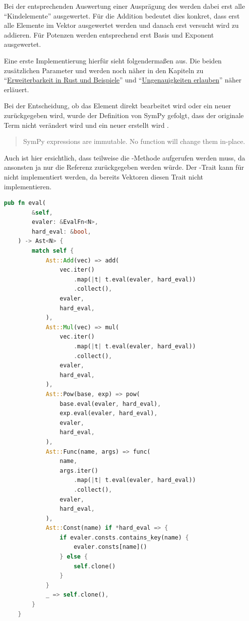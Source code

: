 \documentclass[11pt,a4paper, ngerman]{article}
\begin{document}
Bei der entsprechenden Auswertung einer Ausprägung des  werden dabei erst alle ``Kindelemente'' ausgewertet. Für die Addition bedeutet dies konkret, dass erst alle Elemente im Vektor ausgewertet werden und danach erst versucht wird zu addieren. Für Potenzen werden entsprechend erst Basis und Exponent ausgewertet.

Eine erste Implementierung hierfür sieht folgendermaßen aus. Die beiden zusätzlichen Parameter  und  werden noch näher in den Kapiteln zu ``\hyperref[sec:kapErRustUndBei]{Erweiterbarkeit in Rust und Beispiele}'' und ``\hyperref[sec:ungenauigkeitenKapitel]{Ungenauigkeiten erlauben}'' näher erläuert.

Bei der Entscheidung, ob das Element direkt bearbeitet wird oder ein neuer  zurückgegeben wird, wurde der Definition von SymPy gefolgt, dass der originale Term nicht verändert wird und ein neuer erstellt wird \cite{SymPySubs}.

\begin{quote}
    SymPy expressions are immutable. No function will change them in-place.
\end{quote}

Auch ist hier ersichtlich, dass teilweise die -Methode aufgerufen werden muss, da ansonsten ja nur die Referenz  zurückgegeben werden würde. Der -Trait kann für  nicht implementiert werden, da bereits Vektoren diesen Trait nicht implementieren.

\begin{lstlisting}[language=rust, caption={eval-Methode 1. Implementierung}]
pub fn eval(
        &self,
        evaler: &EvalFn<N>,
        hard_eval: &bool,
    ) -> Ast<N> {
        match self {
            Ast::Add(vec) => add(
                vec.iter()
                    .map(|t| t.eval(evaler, hard_eval))
                    .collect(),
                evaler,
                hard_eval,
            ),
            Ast::Mul(vec) => mul(
                vec.iter()
                    .map(|t| t.eval(evaler, hard_eval))
                    .collect(),
                evaler,
                hard_eval,
            ),
            Ast::Pow(base, exp) => pow(
                base.eval(evaler, hard_eval),
                exp.eval(evaler, hard_eval),
                evaler,
                hard_eval,
            ),
            Ast::Func(name, args) => func(
                name,
                args.iter()
                    .map(|t| t.eval(evaler, hard_eval))
                    .collect(),
                evaler,
                hard_eval,
            ),
            Ast::Const(name) if *hard_eval => {
                if evaler.consts.contains_key(name) {
                    evaler.consts[name]()
                } else {
                    self.clone()
                }
            }
            _ => self.clone(),
        }
    }
\end{lstlisting}
\end{document}
